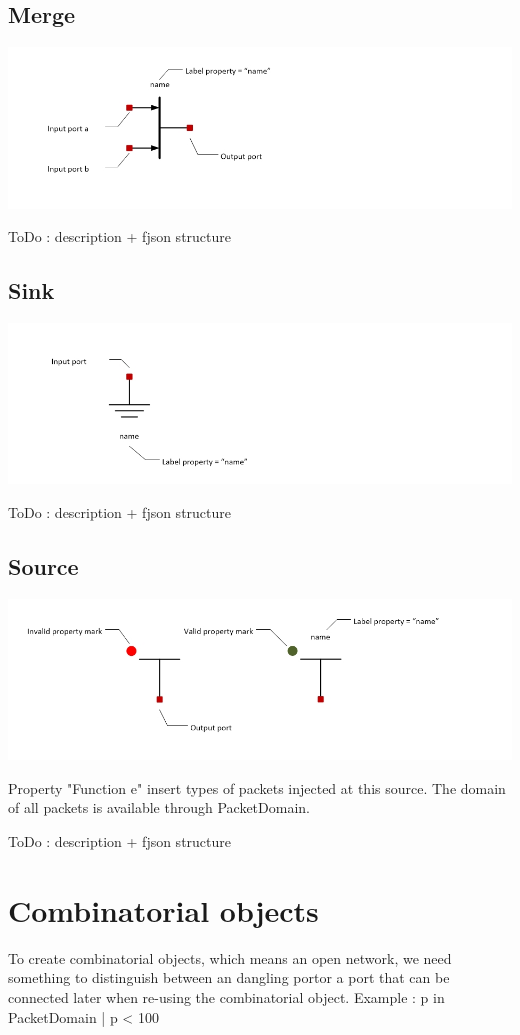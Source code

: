 \documentclass[a4paper,11pt,final]{article}
\begin{document}
\subsection{Merge}
\includegraphics[width=1.0\textwidth]{merge}

ToDo : description + fjson structure

\subsection{Sink}
\includegraphics[width=1.0\textwidth]{sink}

ToDo : description + fjson structure

\subsection{Source}
\includegraphics[width=1.0\textwidth]{source}

Property "Function e" insert types of packets injected at this source. The
domain of all packets is available through PacketDomain.

ToDo : description + fjson structure

\newpage
\section{Combinatorial objects} To create combinatorial objects, which
means an open network, we need something to distinguish between an dangling portor a port that can be connected later when re-using the combinatorial object.
Example : {p in PacketDomain | p < 100}
\end{document}
